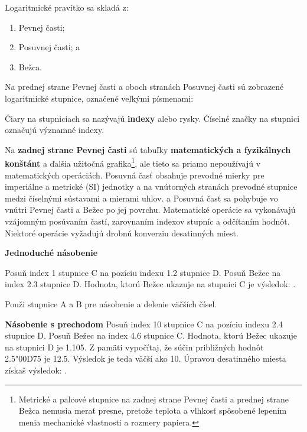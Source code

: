   \begin{multicols*}{3}
  \normalsize{
  Logaritmické pravítko sa skladá z:
    \begin{enumerate}
      \setlength{\parskip}{0pt}
      \setlength{\parsep}{0pt}
      \item Pevnej časti;
      \item Posuvnej časti; a
      \item Bežca.
    \end{enumerate}

  Na prednej strane Pevnej časti a oboch stranách Posuvnej časti sú zobrazené logaritmické stupnice, označené veľkými písmenami:

  
  Čiary na stupniciach sa nazývajú \textbf{indexy} alebo rysky. Číselné značky na stupnici označujú významné indexy.

  Na \textbf{zadnej strane Pevnej časti} sú tabuľky \textbf{matematických a fyzikálnych konštánt} a ďalšia užitočná grafika\footnote{Metrické a palcové stupnice na zadnej strane Pevnej časti a prednej strane Bežca nemusia merať presne, pretože teplota a vlhkosť spôsobené lepením menia mechanické vlastnosti a rozmery papiera.}, ale tieto sa priamo nepoužívajú v matematických operáciách. Posuvná časť  obsahuje prevodné mierky pre imperiálne a metrické (SI) jednotky a na vnútorných stranách prevodné stupnice medzi číselnými sústavami a mierami uhlov.
a
  Posuvná časť sa pohybuje vo vnútri Pevnej časti a Bežec po jej povrchu. Matematické operácie sa vykonávajú vzájomným posúvaním častí, zarovnaním indexov stupníc a odčítaním hodnôt. Niektoré operácie vyžadujú drobnú konverziu desatinných miest.

  

  \textbf{Jednoduché násobenie}

Posuň index 1 stupnice C na pozíciu indexu 1.2 stupnice D.
Posuň Bežec na index 2.3 stupnice D.
Hodnota, ktorú Bežec ukazuje na stupnici C je výsledok: .

\footnotesize Použi stupnice A a B pre násobenie a delenie väčších čísel.\normalsize

  \textbf{Násobenie s prechodom}
Posuň index 10 stupnice C na pozíciu indexu 2.4 stupnice D.
Posuň Bežec na index 4.6 stupnice C.
Hodnota, ktorú Bežec ukazuje na stupnici D je 1.105.
Z pamäti vypočítaj, že súčin približných hodnôt 2.5{\char"00D7}5 je 12.5.
Výsledok je teda väčší ako 10.
Úpravou desatinného miesta získaš výsledok: . 

}
\end{multicols*}

